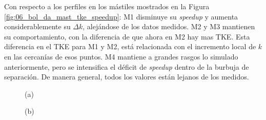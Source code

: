 \vspace*{\fill}
\newpage
Con respecto a los perfiles en los mástiles mostrados en la Figura \ref{fig:06_bol_da_mast_tke_speedup}: M1 disminuye su \emph{speedup} y aumenta considerablemente su $\Delta k$, alejándose de los datos medidos. M2 y M3 mantienen su comportamiento, con la diferencia de que ahora en M2 hay mas TKE. Esta diferencia en el TKE para M1 y M2, está relacionada con el incremento local de $k$ en las cercanías de esos puntos. M4 mantiene a grandes rasgos lo simulado anteriormente, pero se intensifica el déficit de \emph{speedup} dentro de la burbuja de separación. De manera general, todos los valores están lejanos de los medidos.
\vspace*{\fill}
\begin{figure}[H]
	\begin{minipage}{0.5\linewidth}
		\centering
		\hspace{7mm}(a)\end{minipage}%
	\begin{minipage}{0.5\linewidth}
		\centering
		\hspace{-5mm}(b)\end{minipage}%
	

\end{figure}
